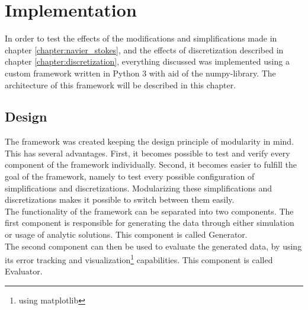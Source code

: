 
\chapter{Implementation}\label{chapter:implementation}
In order to test the effects of the modifications and simplifications made in chapter \ref{chapter:navier_stokes}, and the effects of discretization described in chapter \ref{chapter:discretization}, everything discussed was implemented using a custom framework written in Python 3 with aid of the numpy-library.
The architecture of this framework will be described in this chapter.

\section{Design}
The framework was created keeping the design principle of modularity in mind.
This has several advantages.
First, it becomes possible to test and verify every component of the framework individually.
Second, it becomes easier to fulfill the goal of the framework, namely to test every possible configuration of simplifications and discretizations.
Modularizing these simplifications and discretizations makes it possible to switch between them easily.
\\
The functionality of the framework can be separated into two components. 
The first component is responsible for generating the data through either simulation or usage of analytic solutions.
This component is called Generator.
\\
The second component can then be used to evaluate the generated data, by using its error tracking and visualization\footnote{using matplotlib} capabilities.
This component is called Evaluator.

